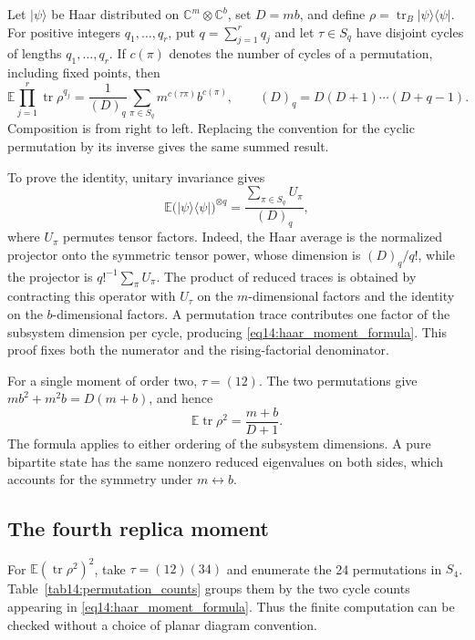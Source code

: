 \documentclass[11pt,letterpaper]{article}
\theoremstyle{plain}
\theoremstyle{definition}
\theoremstyle{remark}
\newcommand{\E}{\mathbb{E}}
\DeclareMathOperator{\tr}{tr}
\begin{document}
Let $|\psi\rangle$ be Haar distributed on
$\mathbb C^m\otimes\mathbb C^b$, set $D=mb$, and define
$\rho=\tr_B|\psi\rangle\langle\psi|$.  For positive integers
$q_1,\ldots,q_r$, put $q=\sum_{j=1}^r q_j$ and let
$\tau\in S_q$ have disjoint cycles of lengths $q_1,\ldots,q_r$.
If $c(\pi)$ denotes the number of cycles of a permutation, including
fixed points, then
\begin{equation}
 \E\prod_{j=1}^r\tr\rho^{q_j}
 =\frac{1}{(D)_q}
   \sum_{\pi\in S_q}m^{c(\tau\pi)}b^{c(\pi)},
 \qquad (D)_q=D(D+1)\cdots(D+q-1).
 \label{eq14:haar_moment_formula}
\end{equation}
Composition is from right to left.  Replacing the convention for the
cyclic permutation by its inverse gives the same summed result.

To prove the identity, unitary invariance gives
\begin{equation}
 \E\bigl(|\psi\rangle\langle\psi|\bigr)^{\otimes q}
 =\frac{\sum_{\pi\in S_q}U_\pi}{(D)_q},
 \label{eq14:symmetric_projector}
\end{equation}
where $U_\pi$ permutes tensor factors.  Indeed, the Haar average is the
normalized projector onto the symmetric tensor power, whose dimension
is $(D)_q/q!$, while the projector is $q!^{-1}\sum_\pi U_\pi$.
The product of reduced traces is obtained by contracting this operator
with $U_\tau$ on the $m$-dimensional factors and the identity on the
$b$-dimensional factors.  A permutation trace contributes one factor
of the subsystem dimension per cycle, producing
\eqref{eq14:haar_moment_formula}.  This proof fixes both the numerator
and the rising-factorial denominator.

For a single moment of order two, $\tau=(12)$.  The two permutations
give $mb^2+m^2b=D(m+b)$, and hence
\begin{equation}
 \E\tr\rho^2=\frac{m+b}{D+1}.
 \label{eq14:purity_mean}
\end{equation}
The formula applies to either ordering of the subsystem dimensions.
A pure bipartite state has the same nonzero reduced eigenvalues on
both sides, which accounts for the symmetry under $m\leftrightarrow b$.

\subsection{The fourth replica moment}
\label{subsec14:purity_covariance}

For $\E(\tr\rho^2)^2$, take $\tau=(12)(34)$ and enumerate the
24 permutations in $S_4$.  Table~\ref{tab14:permutation_counts} groups
them by the two cycle counts appearing in
\eqref{eq14:haar_moment_formula}.  Thus the finite computation can be
checked without a choice of planar diagram convention.
\end{document}
